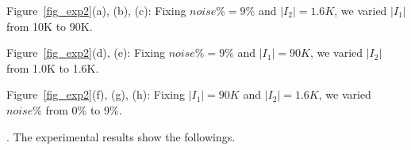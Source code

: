 Figure~\ref{fig_exp2}(a), (b), (c): Fixing $noise\% = 9\%$ and $|I_2| = 1.6K$, we varied $|I_1|$ from 10K to 90K.

Figure~\ref{fig_exp2}(d), (e): Fixing $noise\% = 9\%$ and $|I_1| = 90K$, we varied $|I_2|$ from 1.0K to 1.6K.

Figure~\ref{fig_exp2}(f), (g), (h): Fixing $|I_1| = 90K$ and $|I_2| = 1.6K$, we varied $noise\%$ from 0\% to 9\%.

. The experimental results show the followings.








